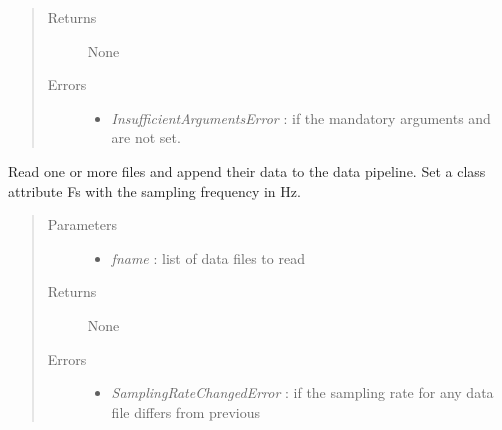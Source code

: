 \documentclass[letterpaper,10pt,english]{sphinxmanual}
\begin{document}
\begin{fulllineitems}
\begin{quote}
\begin{description}
\begin{description}
\begin{itemize}
\end{itemize}

\end{description}

\item[{Returns}] \leavevmode
None

\item[{Errors}] \leavevmode\begin{itemize}
\item {} 
\emph{InsufficientArgumentsError} : if the mandatory arguments  and  are not set.

\end{itemize}

\end{description}\end{quote}

\begin{fulllineitems}
\label{api-doc/mosaic.traj:mosaic.qdfTrajIO.qdfTrajIO.readdata}
Read one or more files and append their data to the data pipeline.
Set a class attribute Fs with the sampling frequency in Hz.
\begin{quote}\begin{description}
\item[{Parameters}] \leavevmode\begin{itemize}
\item {} 
\emph{fname} :  list of data files to read

\end{itemize}

\item[{Returns}] \leavevmode
None

\item[{Errors}] \leavevmode\begin{itemize}
\item {} 
\emph{SamplingRateChangedError} : if the sampling rate for any data file differs from previous

\end{itemize}

\end{description}\end{quote}

\end{fulllineitems}


\end{fulllineitems}
\end{document}
